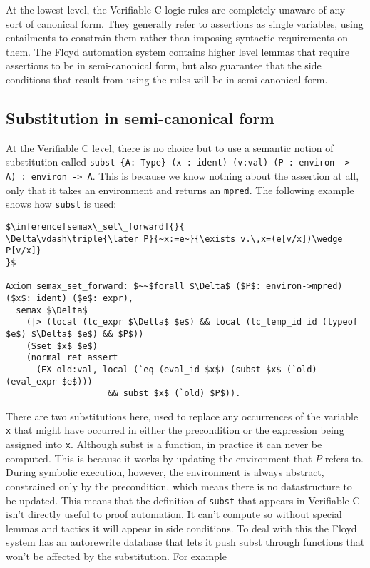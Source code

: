\documentclass{puthesis}
\begin{document}
At the lowest level, the Verifiable C 
logic rules are completely unaware of any
sort of canonical form. They generally refer to assertions as single
variables, using entailments to constrain them rather than imposing
syntactic requirements on them. The Floyd automation system contains
higher level lemmas that require assertions to be in semi-canonical
form, but also guarantee that the side conditions that result from
using the rules will be in semi-canonical form. 

\subsection{Substitution in semi-canonical form}

At the Verifiable C level, there is no choice but to use a semantic
notion of substitution called 
\lstinline|subst {A: Type} (x : ident) (v:val) (P : environ -> A) : environ -> A|.
This is because we know nothing about the assertion at all, only that
it takes an environment and returns an \lstinline|mpred|. The following example
shows how \lstinline|subst| is used:

\begin{lstlisting}
$\inference[semax\_set\_forward]{}{
\Delta\vdash\triple{\later P}{~x:=e~}{\exists v.\,x=(e[v/x])\wedge P[v/x]}
}$

Axiom semax_set_forward: $~~$forall $\Delta$ ($P$: environ->mpred) ($x$: ident) ($e$: expr),
  semax $\Delta$
    (|> (local (tc_expr $\Delta$ $e$) && local (tc_temp_id id (typeof $e$) $\Delta$ $e$) && $P$))
    (Sset $x$ $e$) 
    (normal_ret_assert 
      (EX old:val, local (`eq (eval_id $x$) (subst $x$ (`old) (eval_expr $e$)))
                    && subst $x$ (`old) $P$)).
\end{lstlisting}

There are two substitutions here, used to replace any occurrences of the
variable \lstinline|x| that might have occurred in either the precondition
or the expression being assigned into \lstinline|x|. 
Although subst is a function, in practice it can never be computed.
This is because it works by updating the environment that $P$
refers to. During symbolic execution, however, the environment is always
abstract, constrained only by the precondition, which means there is
no datastructure to be updated. This means that the definition of 
\lstinline|subst| that appears in Verifiable C isn't directly 
useful to proof automation. It can't compute so without special
lemmas and tactics it will appear in side conditions. To deal with
this the Floyd system has an autorewrite database that lets it push
subst through functions that won't be affected by the substitution. For
example 
\end{document}
